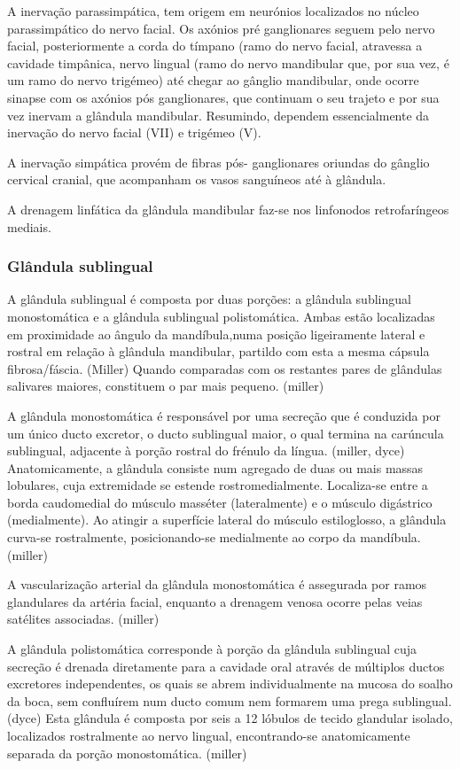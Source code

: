 A inervação parassimpática, tem origem em neurónios localizados no núcleo parassimpático do nervo facial. Os axónios pré ganglionares seguem pelo nervo facial, posteriormente a corda do tímpano (ramo do nervo facial, atravessa a cavidade timpânica, nervo lingual (ramo do nervo mandibular que, por sua vez, é um ramo do nervo trigémeo) até chegar ao gânglio mandibular, onde ocorre sinapse com os axónios pós ganglionares, que continuam o seu trajeto e por sua vez inervam a glândula mandibular. Resumindo, dependem essencialmente da inervação do nervo facial (VII) e trigémeo (V).


A inervação simpática provém de fibras pós- ganglionares  oriundas do gânglio cervical cranial, que acompanham os vasos sanguíneos até à glândula.


A drenagem linfática da glândula mandibular faz-se nos linfonodos retrofaríngeos mediais.

\subsubsection{Glândula sublingual}

A glândula sublingual é composta por duas porções: a glândula sublingual monostomática e a glândula sublingual polistomática. Ambas estão localizadas em proximidade ao ângulo da mandíbula,numa posição ligeiramente lateral e rostral em relação à glândula mandibular, partil\cite{Han2016}do com esta a mesma cápsula fibrosa/fáscia. (Miller) \cite{Brown2016} Quando comparadas com os restantes pares de glândulas salivares maiores, constituem o par mais pequeno. (miller)


A glândula monostomática é responsável por uma secreção que é conduzida por um único ducto excretor, o ducto sublingual maior, o qual termina na carúncula sublingual, adjacente à porção rostral do frénulo da língua. (miller, dyce) Anatomicamente, a glândula consiste num agregado de duas ou mais massas lobulares, cuja extremidade se estende rostromedialmente. Localiza-se entre a borda caudomedial do músculo masséter (lateralmente) e o músculo digástrico (medialmente). Ao atingir a superfície lateral do músculo estiloglosso, a glândula curva-se rostralmente, posicionando-se medialmente ao corpo da mandíbula. (miller)


A vascularização arterial da glândula monostomática é assegurada por ramos glandulares da artéria facial, enquanto a drenagem venosa ocorre pelas veias satélites associadas. (miller)


A glândula polistomática corresponde à porção da glândula sublingual cuja secreção é drenada diretamente para a cavidade oral através de múltiplos ductos excretores independentes, os quais se abrem individualmente na mucosa do soalho da boca, sem confluírem num ducto comum nem formarem uma prega sublingual. (dyce)\cite{lemmons2018} Esta glândula é composta por seis  a 12 lóbulos de tecido glandular isolado, localizados rostralmente ao nervo lingual, encontrando-se anatomicamente separada da porção monostomática. (miller)


